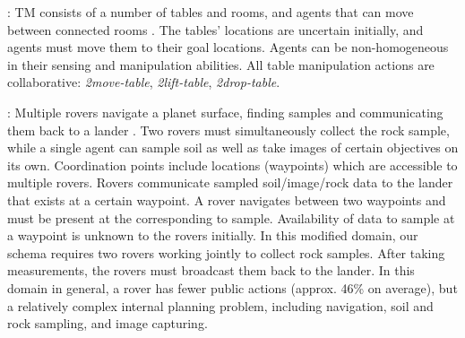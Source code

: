 \documentclass[letterpaper]{article} %
\theoremstyle{definition}
\begin{document}
: TM consists of a number of tables and rooms, and agents that can move between connected rooms \citep{ShekharB20}.
The tables' locations are uncertain initially, and agents must move them to their goal locations.
Agents can be non-homogeneous in their sensing and manipulation abilities.
All table manipulation actions are collaborative:
\emph{2move-table}, \emph{2lift-table}, \emph{2drop-table}.

:
Multiple rovers navigate a planet surface, finding samples and communicating them back to a lander \citep{IMAP}.
Two rovers must simultaneously collect the rock sample, while a single agent can sample soil as well as take images of certain objectives on its own.
Coordination points include locations (waypoints) which are accessible to multiple rovers. Rovers communicate sampled soil/image/rock data to the lander that exists at a certain waypoint.
A rover navigates between two waypoints
and must be present at the corresponding %
to sample.
Availability of data to sample at a waypoint is unknown to the rovers initially.
%
%
In this modified domain, our schema requires two rovers working jointly to collect rock samples. After taking measurements, the rovers must broadcast them back to the lander.
In this domain in general, a rover has fewer public actions (approx. 46\% on average), but a relatively complex internal planning problem, including navigation, soil and rock sampling, and image capturing.
%
\end{document}
